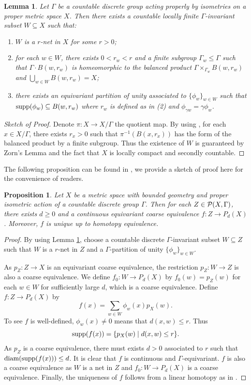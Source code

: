 \documentclass[11pt]{article}
\theoremstyle{definition}
\theoremstyle{plain}
\newtheorem{Lem}[Def]{Lemma}
\newtheorem{Pro}[Def]{Proposition}
\def\supp{\textup{supp}}
\def\diam{\textup{diam}}
\def\Ga{\Gamma}
\begin{document}
\begin{Lem}\label{partition of unity}
Let $\Ga$ be a countable discrete group acting properly by isometries on a proper metric space $X$. Then there exists a countable locally finite $\Ga$-invariant subset $W\subseteq X$ such that:\begin{enumerate}
\item[(1)] $W$ is a $r$-net in $X$ for some $r>0$;
\item[(2)] for each $w\in W$, there exists $0<r_w<r$ and a finite subgroup $\Ga_w\leq\Ga$ such that $\Ga\cdot B(w,r_w)$ is homeomorphic to the balanced product $\Ga\times_{\Ga_w}B(w,r_w)$ and $\bigcup_{w\in W}B(w,r_w)=X$;
\item[(3)] there exists an equivariant partition of unity associated to $\{\phi_w\}_{w\in W}$ such that $\supp(\phi_w)\subseteq B(w,r_w)$ where $r_w$ is defined as in (2) and $\phi_{\gamma w}=\gamma\phi_w$.
\end{enumerate}\end{Lem}

\begin{proof}[Sketch of Proof]
Denote $\pi: X\to X/\Ga$ the quotient map. By using \cite[Lemma A.2.7]{HIT2020}, for each $x\in X/\Ga$, there exists $r_x>0$ such that $\pi^{-1}(B(x,r_x))$ has the form of the balanced product by a finite subgroup. Thus the existence of $W$ is guaranteed by Zorn's Lemma and the fact that $X$ is locally compact and secondly countable.
\end{proof}


The following proposition can be found in \cite{HIT2020}, we provide a sketch of proof here for the convenience of readers.

\begin{Pro}\label{classifying proper}
Let $X$ be a metric space with bounded geometry and proper isometric action of a countable discrete group $\Ga$. Then
for each $Z\in \P(X,\Ga)$, there exists $d\geq0$ and a continuous equivariant coarse equivalence $f:Z\to P_d(X)$. Moreover, $f$ is unique up to homotopy equivalence.
\end{Pro}

\begin{proof}
By using Lemma \ref{partition of unity}, choose a countable discrete $\Ga$-invariant subset $W\subseteq Z$ such that $W$ is a $r$-net in $Z$ and a $\Ga$-partition of unity $\{\phi_w\}_{w\in W}$.

As $p_Z: Z\to X$ is an equivariant coarse equivalence, the restriction $p_Z: W\to Z$ is also a coarse equivalence. We define $f_0:W\to P_d(X)$ by $f_0(w)=p_Z(w)$ for each $w\in W$ for sufficiently large $d$, which is a coarse equivalence. Define $f:Z\to P_d(X)$ by
$$f(x)=\sum_{w\in W}\phi_w(x)p_X(w).$$
To see $f$ is well-defined, $\phi_w(x)\ne 0$ means that $d(x,w)\leq r$. Thus
$$\supp(f(x))=\{p_X(w)\mid d(x,w)\leq r\}.$$
As $p_Z$ is a coarse equivalence, there must exists $d>0$ associated to $r$ such that $\diam(\supp(f(x)))\leq d$. It is clear that $f$ is continuous and $\Ga$-equivariant. $f$ is also a coarse equivalence as $W$ is a net in $Z$ and $f_0:W\to P_d(X)$ is a coarse equivalence. Finally, the uniqueness of $f$ follows from a linear homotopy as in \cite[Lemma 7.2.14]{HIT2020}.
\end{proof}
\end{document}
